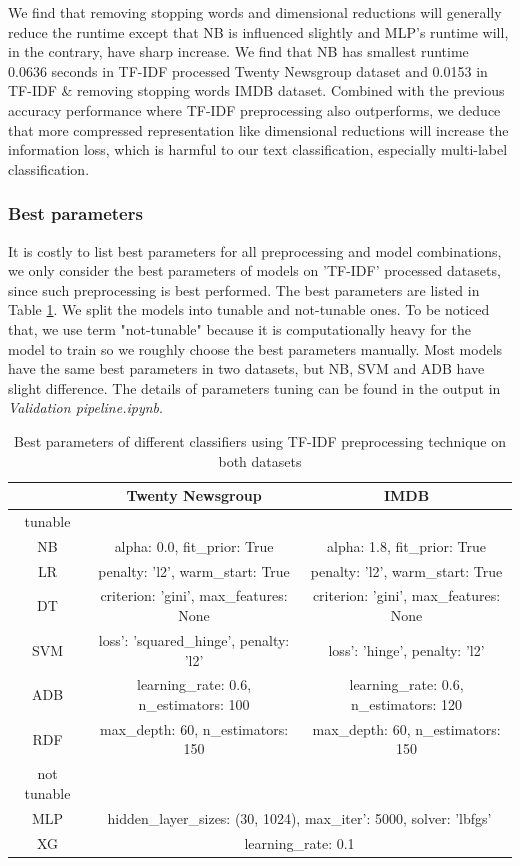 \documentclass[11pt]{scrartcl}
\begin{document}
We find that removing stopping words and dimensional reductions will generally reduce the runtime except that NB is influenced slightly and MLP's runtime will, in the contrary, have sharp increase. We find that NB has smallest runtime 0.0636 seconds in TF-IDF processed Twenty Newsgroup dataset and 0.0153 in TF-IDF \& removing stopping words IMDB dataset. Combined with the previous accuracy performance where TF-IDF preprocessing also outperforms, we deduce that more compressed representation like dimensional reductions will increase the information loss, which is harmful to our text classification, especially multi-label classification.

\subsubsection*{Best parameters}
It is costly to list best parameters for all preprocessing and model combinations, we only consider the best parameters of models on 'TF-IDF' processed datasets, since such preprocessing is best performed. The best parameters are listed in Table \ref{params}. We split the models into tunable and not-tunable ones. To be noticed that, we use term "not-tunable" because it is computationally heavy for the model to train so we roughly choose the best parameters manually. Most models have the same best parameters in two datasets, but NB, SVM and ADB have slight difference. The details of parameters tuning can be found in the output in \textit{Validation pipeline.ipynb}.

\begin{table}[H]
    \centering
    \begin{tabular}{c|cc}
        \hline
         &  Twenty Newsgroup  &  IMDB  \\
		\hline
		tunable & & \\
		\hline
        NB & alpha: 0.0, fit\_prior: True & alpha: 1.8, fit\_prior: True \\
		LR & penalty: 'l2', warm\_start: True & penalty: 'l2', warm\_start: True \\
		DT & criterion: 'gini', max\_features: None & criterion: 'gini', max\_features: None \\
		SVM & loss': 'squared\_hinge', penalty: 'l2' & loss': 'hinge', penalty: 'l2'\\
		ADB & learning\_rate: 0.6, n\_estimators: 100 & learning\_rate: 0.6, n\_estimators: 120 \\
		RDF & max\_depth: 60, n\_estimators: 150 & max\_depth: 60, n\_estimators: 150 \\
		\hline
		not tunable & & \\
		\hline
		MLP &  \multicolumn{2}{c}{hidden\_layer\_sizes: (30, 1024), max\_iter': 5000, solver: 'lbfgs' }  \\
		XG & \multicolumn{2}{c}{learning\_rate: 0.1}  \\
        \hline
    \end{tabular} 
    \caption{Best parameters of different classifiers using TF-IDF preprocessing technique on both datasets}
    \label{params}
\end{table}
\end{document}
